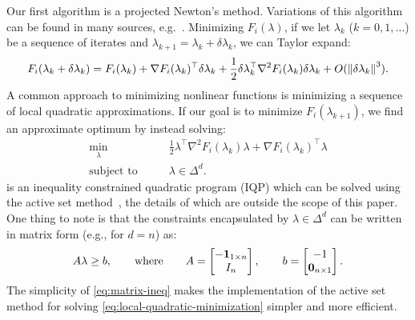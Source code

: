 \documentclass[eikonal.tex]{subfiles}
\begin{document}
Our first algorithm is a projected Newton's method. Variations of this
algorithm can be found in many sources,
e.g.~\cite{bertsekas1999nonlinear,nocedal2006numerical}. Minimizing
$F_i(\lambda)$, if we let $\lambda_k$ ($k = 0, 1, \hdots$) be a
sequence of iterates and
$\lambda_{k+1} = \lambda_k + \delta\lambda_k$, we can
Taylor expand:
\begin{equation}
  F_i(\lambda_k + \delta\lambda_k) = F_i(\lambda_k) + \nabla F_i(\lambda_k)^\top \delta\lambda_k + \frac{1}{2} \delta\lambda_k^\top \nabla^2 F_i(\lambda_k) \delta\lambda_k + O(\left\|\delta\lambda_k\right\|^3).
\end{equation}
A common approach to minimizing nonlinear functions is minimizing a
sequence of local quadratic approximations. If our goal is to minimize
$F_i(\lambda_{k+1})$, we find an approximate optimum by instead
solving:
\begin{equation}\label{eq:local-quadratic-minimization}
  \begin{split}
    \min_{\lambda} &\qquad \frac{1}{2} \lambda^\top \nabla^2 F_i(\lambda_k) \lambda + \nabla F_i(\lambda_k)^\top \lambda \\
    \text{subject to} &\qquad \lambda \in \Delta^d.
  \end{split}
\end{equation}
 is an inequality constrained
quadratic program (IQP) which can be solved using the active set
method~\cite{nocedal2006numerical}, the details of which are outside
the scope of this paper. One thing to note is that the constraints
encapsulated by $\lambda \in \Delta^d$ can be written in matrix form
(e.g., for $d = n$) as:
\begin{equation}
  \label{eq:matrix-ineq}
  A \lambda \geq b, \qquad \text{where} \qquad A = \begin{bmatrix}
    -\m{1}_{1 \times n} \\ I_n
  \end{bmatrix}, \qquad b = \begin{bmatrix} -1 \\ \m{0}_{n \times 1} \end{bmatrix}.
\end{equation}
The simplicity of \cref{eq:matrix-ineq} makes the implementation of
the active set method for solving
\cref{eq:local-quadratic-minimization} simpler and more efficient.
\end{document}
